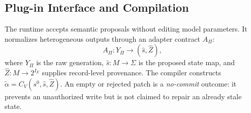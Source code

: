 \subsection{Plug-in Interface and Compilation}
The \method{} runtime accepts semantic proposals without editing model parameters. It normalizes heterogeneous outputs through an adapter contract $A_\Pi$:
\begin{equation}
A_\Pi: Y_\Pi \rightarrow (\widehat{s}, \widehat{Z}),
\end{equation}
where $Y_\Pi$ is the raw generation, $\widehat{s}:M\rightarrow\Sigma$ is the proposed state map, and $\widehat Z:M\rightarrow2^{I_E}$ supplies record-level provenance. The compiler constructs $\widetilde\alpha=C_V(s^0,\widehat{s},\widehat Z)$. An empty or rejected patch is a \emph{no-commit} outcome: it prevents an unauthorized write but is not claimed to repair an already stale state.

